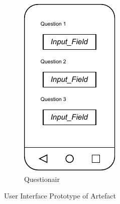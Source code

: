\begin{figure}
\begin{subfigure}[b]{0.25\textwidth}
        \centering
        \includegraphics[width=\textwidth]{content/05_design_and_dev_artefacts/ActivityQuestionair.drawio.pdf}
        \caption{ Questionair}
        \label{subfig:Questionair}

    \end{subfigure}
       \caption{User Interface Prototype of Artefact}
       \label{fig:uiPrototypeArtefact}
\end{figure}

